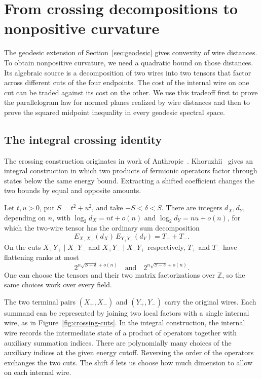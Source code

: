 \section{From crossing decompositions to nonpositive curvature}
\label{sec:crossing}

The geodesic extension of Section~\ref{sec:geodesic} gives convexity of
wire distances. To obtain nonpositive curvature, we need a quadratic
bound on those distances. Its algebraic source is a decomposition of two
wires into two tensors that factor across different cuts of the four
endpoints. The cost of the internal wire on one cut can be traded
against its cost on the other. We use this tradeoff first to prove the
parallelogram law for normed planes realized by wire distances and then
to prove the squared midpoint inequality in every geodesic spectral
space.

\subsection{The integral crossing identity}\label{app:crossing}

The crossing construction originates in work of Anthropic~\cite{Anthropic}.
Khoruzhii~\cite{Khoruzhii} gives an integral construction in which two
products of fermionic operators factor through states below the same
energy bound. Extracting a shifted coefficient changes the two bounds
by equal and opposite amounts.
\begin{theorem}\label{thm:crossing}
Let $t,u>0$, put $S=t^2+u^2$, and take $-S<\delta<S$. There are
integers $d_X,d_Y$, depending on $n$, with
$\log_2 d_X=nt+o(n)$ and $\log_2 d_Y=nu+o(n)$, for which the
two-wire tensor has the ordinary sum decomposition
\[
 E_{X_+X_-}(d_X)\,E_{Y_+Y_-}(d_Y)=T_++T_-.
\]
On the cuts $X_+Y_+\mid X_-Y_-$ and $X_+Y_-\mid X_-Y_+$ respectively,
$T_+$ and $T_-$ have flattening ranks at most
\[
  2^{n\sqrt{S+\delta}+o(n)}
  \quad\text{and}\quad
  2^{n\sqrt{S-\delta}+o(n)} .
\]
One can choose the tensors and their two matrix factorizations over
$\mathbb Z$, so the same choices work over every field.
\end{theorem}

The two terminal pairs $(X_+,X_-)$ and $(Y_+,Y_-)$ carry the original
wires. Each summand can be represented by joining two local factors
with a single internal wire, as in Figure~\ref{fig:crossing-cuts}.
In the integral construction, the internal wire records the intermediate
state of a product of operators together with auxiliary summation indices.
There are polynomially many choices of the auxiliary indices at the given
energy cutoff. Reversing the order of the operators exchanges the two cuts. The shift $\delta$ lets us choose how much dimension to
allow on each internal wire.

